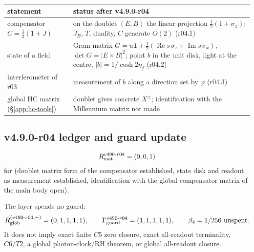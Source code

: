 \begin{center}
\small
\begin{tabular}{@{}>{\raggedright\arraybackslash}p{}>{\raggedright\arraybackslash}p{}@{}}
\toprule
statement & status after v4.9.0-r04\\
\midrule
compensator \(C=\tfrac12(1+J)\) & on the doublet \((E,B)\) the linear projection \(\tfrac12(1+\sigma_x)\); \(J_B\), \(T\), duality, \(C\) generate \(O(2)\) (r04.1)\\
state of a field & Gram matrix \(G=u\mathbf 1+\tfrac12(\operatorname{Re}s\,\sigma_z+\operatorname{Im}s\,\sigma_x)\), \(\det G=|E\times B|^2\); point \(b\) in the unit disk, light at the centre, \(|b|=1/\cosh2\eta_f\) (r04.2)\\
interferometer of r03 & measurement of \(b\) along a direction set by \(\varphi\) (r04.3)\\
global HC matrix (\S\ref{app:hc-tools}) & doublet gives concrete \(X^\pm\); identification with the Millennium matrix not made\\
\bottomrule
\end{tabular}
\end{center}

\subsection*{v4.9.0-r04 ledger and guard update}
\label{subsec:v490-r04-ledger-guard}

\[
R_{\rm mat}^{v490\text{-}r04}=(0,0,1)
\]
for (doublet matrix form of the compensator established, state disk and readout as measurement established,
identification with the global compensator matrix of the main body open).

The layer spends no guard:
\[
R_{\rm glob}^{(v490\text{-}r04,+)}=(0,1,1,1,1),
\qquad
\Gamma_{\rm guard}^{v490\text{-}r04}=(1,1,1,1,1),
\qquad
\beta_4=1/256\ \text{unspent}.
\]
It does not imply exact finite \(C5\) zero closure, exact all-readout terminality,
\(C6/T2\), a global photon-clock/RH theorem, or global all-readout closure.

